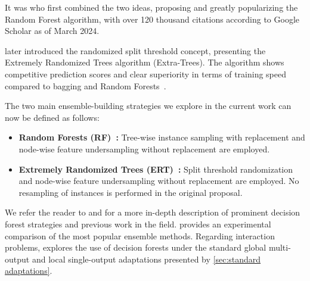 It was  who first combined the two ideas, proposing and greatly popularizing the Random Forest algorithm, with over 120 thousand citations according to Google Scholar as of March 2024.

 later introduced the randomized split threshold concept, presenting the Extremely Randomized Trees algorithm (Extra-Trees). The algorithm shows competitive prediction scores and clear superiority in terms of training speed compared to bagging and Random Forests~\cite{geurts2006extremely,schrynemackers2015classifying}.

The two main ensemble-building strategies we explore in the current work can now be defined as follows:

\begin{itemize}
    \item \textbf{Random Forests (RF)~\cite{breiman2001random}:} Tree-wise instance sampling with replacement and node-wise feature undersampling without replacement are employed.
    \item \textbf{Extremely Randomized Trees (ERT)~\cite{geurts2006extremely}:} Split threshold randomization and node-wise feature undersampling without replacement are employed. No resampling of instances is performed in the original proposal.
\end{itemize}


We refer the reader to  and  for a more in-depth description of prominent decision forest strategies and previous work in the field.  provides an experimental comparison of the most popular ensemble methods.  %
%
Regarding interaction problems,  explores the use of decision forests under the standard global multi-output and local single-output adaptations presented by \autoref{sec:standard adaptations}.

